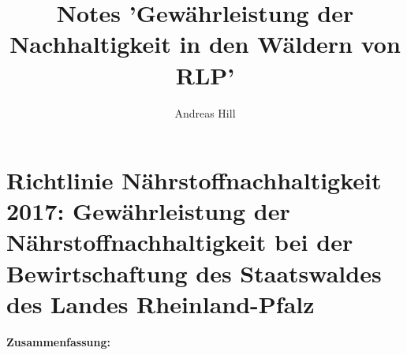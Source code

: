 \documentclass{article}
\title{Notes 'Gewährleistung der Nachhaltigkeit in den Wäldern von RLP'}
\author{Andreas Hill}
\begin{document}

\maketitle
\thispagestyle{empty}
\newpage

\setcounter{page}{1}

\pagestyle{fancy} %
\fancyfoot[C]{\thepage}
\setlength{\headsep}{15mm}

\newcommand{\answer}[1]{\small \color{mybrown}{#1} \color{black}}
\newcommand{\note}[1]{\textit{\small \color{amaranth} \textbf{Note:} #1} \color{black}}
\newcommand{\todo}[1]{\color{red}{#1} \color{black}}
\newcommand{\answerfin}[1]{\small \color{mygreen}{#1} \color{black}}



\section*{Richtlinie Nährstoffnachhaltigkeit 2017: Gewährleistung der Nährstoffnachhaltigkeit bei der Bewirtschaftung des Staatswaldes des Landes Rheinland-Pfalz}

\textbf{Zusammenfassung:}\\
\end{document}
